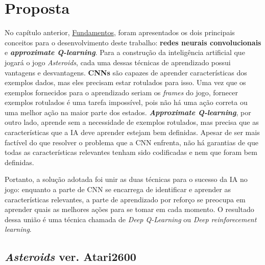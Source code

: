

%
\chapter{Proposta}
\label{cap:proposta}

No capítulo anterior, \hyperref[cap:fundamentos]{Fundamentos}, foram apresentados os dois principais conceitos para o desenvolvimento deste trabalho: \textbf{redes neurais convolucionais} e \textbf{\textit{approximate Q-learning}}.
Para a construção da inteligência artificial que jogará o jogo \textit{Asteroids}, cada uma dessas técnicas de aprendizado possui vantagens e desvantagens.
\textbf{CNNs} são capazes de aprender características dos exemplos dados, mas eles precisam estar rotulados para isso. Uma vez que os exemplos fornecidos para o aprendizado seriam os \textit{frames} do jogo, fornecer exemplos rotulados é uma tarefa impossível, pois não há uma ação correta ou uma melhor ação na maior parte dos estados.
\textbf{\textit{Approximate Q-learning}}, por outro lado, aprende sem a necessidade de exemplos rotulados, mas precisa que as características que a IA deve aprender estejam bem definidas. Apesar de ser mais factível do que resolver o problema que a CNN enfrenta, não há garantias de que todas as características relevantes tenham sido codificadas e nem que foram bem definidas.

Portanto, a solução adotada foi unir as duas técnicas para o sucesso da IA no jogo: enquanto a parte de CNN se encarrega de identificar e aprender as características relevantes, a parte de aprendizado por reforço se preocupa em aprender quais as melhores ações para se tomar em cada momento. O resultado dessa união é uma técnica chamada de \textit{Deep Q-Learning} ou \textit{Deep reinforecement learning}.

\section{\textit{Asteroids} ver. Atari2600}
\label{sec:aa2600}

